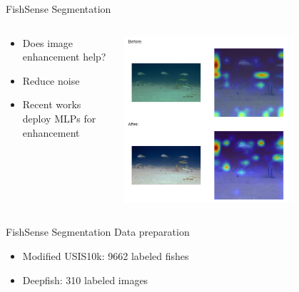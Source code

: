 \begin{frame}{FishSense Segmentation}
    \begin{columns}
        \begin{column}{0.5\textwidth}
            \begin{itemize}
                \item Does image enhancement help?
                \item Reduce noise
                \item Recent works deploy MLPs for enhancement
            \end{itemize}
        \end{column}
        \begin{column}{0.5\textwidth}
            \includegraphics[height=0.7\textheight,width=0.7\textwidth,keepaspectratio]{images/fs_seg_vit_3.png}
        \end{column}
    \end{columns}


\end{frame}

\begin{frame}{FishSense Segmentation}
    Data preparation
    \begin{itemize}
        \item Modified USIS10k: 9662 labeled fishes
        \item Deepfish: 310 labeled images
    \end{itemize}


\end{frame}